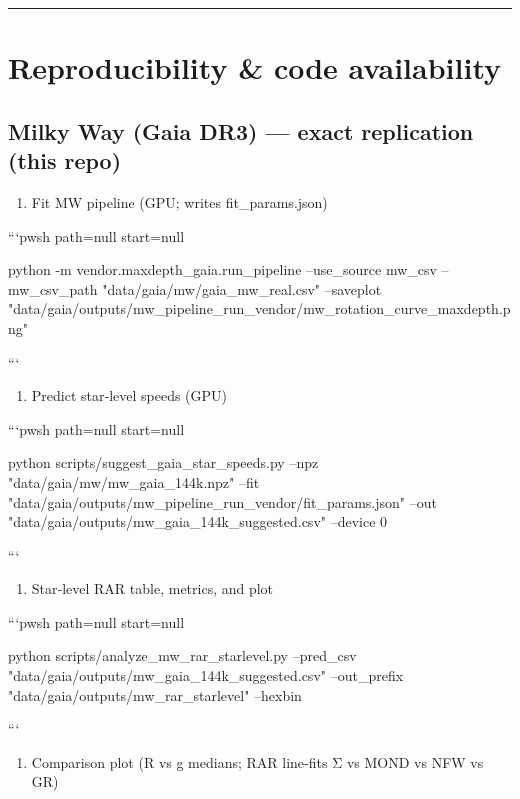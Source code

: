 \documentclass[11pt,a4paper]{article}
\begin{document}
\medskip\hrule\medskip


\section{Reproducibility \& code availability}


\subsection{Milky Way (Gaia DR3) — exact replication (this repo)}


\begin{enumerate}
\item Fit MW pipeline (GPU; writes fit\_params.json)
\end{enumerate}

```pwsh path=null start=null

python -m vendor.maxdepth\_gaia.run\_pipeline --use\_source mw\_csv --mw\_csv\_path "data/gaia/mw/gaia\_mw\_real.csv" --saveplot "data/gaia/outputs/mw\_pipeline\_run\_vendor/mw\_rotation\_curve\_maxdepth.png"

```


\begin{enumerate}
\item Predict star‑level speeds (GPU)
\end{enumerate}

```pwsh path=null start=null

python scripts/suggest\_gaia\_star\_speeds.py --npz "data/gaia/mw/mw\_gaia\_144k.npz" --fit "data/gaia/outputs/mw\_pipeline\_run\_vendor/fit\_params.json" --out "data/gaia/outputs/mw\_gaia\_144k\_suggested.csv" --device 0

```


\begin{enumerate}
\item Star‑level RAR table, metrics, and plot
\end{enumerate}

```pwsh path=null start=null

python scripts/analyze\_mw\_rar\_starlevel.py --pred\_csv "data/gaia/outputs/mw\_gaia\_144k\_suggested.csv" --out\_prefix "data/gaia/outputs/mw\_rar\_starlevel" --hexbin

```


\begin{enumerate}
\item Comparison plot (R vs g medians; RAR line‑fits Σ vs MOND vs NFW vs GR)
\end{enumerate}
\end{document}
